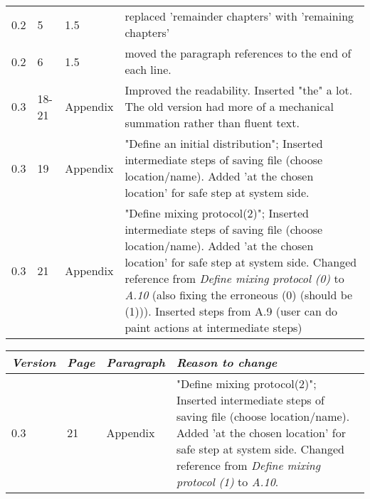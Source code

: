 \begin{tabular}{|l|l|l|p{11cm}|}
    0.2 & 5 & 1.5 & replaced 'remainder chapters' with 'remaining chapters' \\
    0.2 & 6 & 1.5 & moved the paragraph references to the end of each line. \\
    0.3 & 18-21 & Appendix & Improved the readability. Inserted "the" a lot. The old version had more of a mechanical summation rather than fluent text.\\
    0.3 & 19 & Appendix & "Define an initial distribution"; Inserted intermediate steps of saving file (choose location/name). Added 'at the chosen location' for safe step at system side.\\
    0.3 & 21 & Appendix & "Define mixing protocol(2)"; Inserted intermediate steps of saving file (choose location/name). Added 'at the chosen location' for safe step at system side. Changed reference from \emph{Define mixing protocol (0)} to \emph{A.10} (also fixing the erroneous (0) (should be (1))). Inserted steps from A.9 (user can do paint actions at intermediate steps) \\
    \hline
\end{tabular}


 \begin{tabular}{|l|l|l|p{11cm}|}
    \hline
    \emph{Version} & \emph{Page} &   \emph{Paragraph}    &   \emph{Reason to change}\\
    \hline
    0.3 & 21 & Appendix & "Define mixing protocol(2)"; Inserted intermediate steps of saving file (choose location/name). Added 'at the chosen location' for safe step at system side. Changed reference from \emph{Define mixing protocol (1)} to \emph{A.10}.\\
    \hline
\end{tabular}